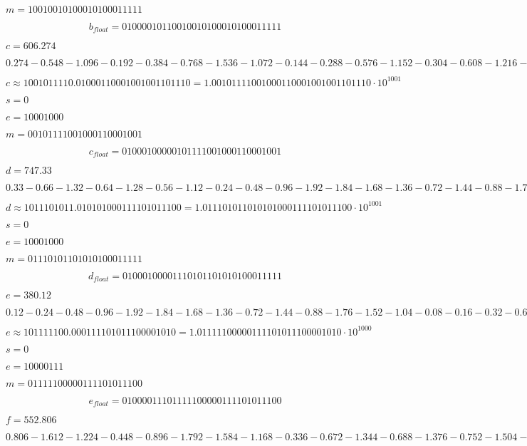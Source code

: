 \documentclass[a4paper,12pt]{article}
\begin{document}
$m = 10010010100010100011111$

\[b_{float} = 01000010110010010100010100011111\]




$c = 606.274$%

$0.274 - 0.548 - 1.096 - 0.192 - 0.384 - 0.768 - 1.536 - 1.072 - 0.144 - 0.288 - 0.576 - 1.152 - 0.304 - 0.608 - 1.216 - 0.432 - 0.864 - 1.728 - 1.456 - 0.912 - 1.824 - 1.648 - 1.296 - 0.592$

$c \approx 1001011110.01000110001001001101110 = 1.00101111001000110001001001101110 \cdot 10^{1001}$

$s = 0$

$e = 10001000$

$m = 00101111001000110001001$

\[c_{float} = 01000100000101111001000110001001\]




$d = 747.33$

$0.33 - 0.66 - 1.32 - 0.64 - 1.28 - 0.56 - 1.12 - 0.24 - 0.48 - 0.96 - 1.92 - 1.84 - 1.68 - 1.36 - 0.72 - 1.44 - 0.88 - 1.76 - 1.52 - 1.04 - 0.08 - 0.16$

$d \approx 1011101011.010101000111101011100 = 1.011101011010101000111101011100 \cdot 10^{1001}$

$s = 0$

$e = 10001000$

$m = 01110101101010100011111$

\[d_{float} = 01000100001110101101010100011111\]




$e = 380.12$


$0.12 - 0.24 - 0.48 - 0.96 - 1.92 - 1.84 - 1.68 - 1.36 - 0.72 - 1.44 - 0.88 - 1.76 - 1.52 - 1.04 - 0.08 - 0.16 - 0.32 - 0.64 - 1.28 - 0.56 - 1.12 - 0.24n$

$e \approx 101111100.000111101011100001010 = 1.01111100000111101011100001010 \cdot 10^{1000}$

$s = 0$

$e = 10000111$

$m = 01111100000111101011100$

\[e_{float} = 01000011101111100000111101011100\]




$f = 552.806$

$0.806 - 1.612 - 1.224 - 0.448 - 0.896 - 1.792 - 1.584 - 1.168 - 0.336 - 0.672 - 1.344 - 0.688 - 1.376 - 0.752 - 1.504 - 1.008 - 0.016 - 0.032 - 0.064 - 0.128 - 0.256 - 0.512 - 1.024 - 0.048$
\end{document}
